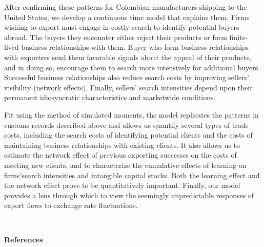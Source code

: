 \documentclass[12pt]{article}
\begin{document}
After confirming these patterns for Colombian manufacturers shipping to the
United States, we develop a continuous time model that explains them. Firms
wishing to export must engage in costly search to identify potential buyers
abroad. The buyers they encounter either reject their products or form
finite-lived business relationships with them. Buyer who form business
relationships with exporters send them favorable signals about the appeal of
their products, and in doing so, encourage them to search more intensively
for additional buyers. Successful business relationships also reduce search
costs by improving sellers' visibility (network effects). Finally, sellers'
search intensities depend upon their permanent idiosyncratic characteristics
and marketwide conditions.

Fit using the method of simulated moments, the model replicates the patterns
in customs records described above and allows us quantify several types of
trade costs, including the search costs of identifying potential clients and
the costs of maintaining business relationships with existing clients. It
also allows us to estimate the network effect of previous exporting
successes on the costs of meeting new clients, and to characterize the
cumulative effects of learning on firms'search intensities and intangible
capital stocks. Both the learning effect and the network effect prove to be
quantitatively important. Finally, our model provides a lens through which
to view the seemingly unpredictable responses of export flows to exchange
rate fluctuations.

\begin{center}
\ \pagebreak

{\Large \textbf{References}}
\end{center}
\end{document}
